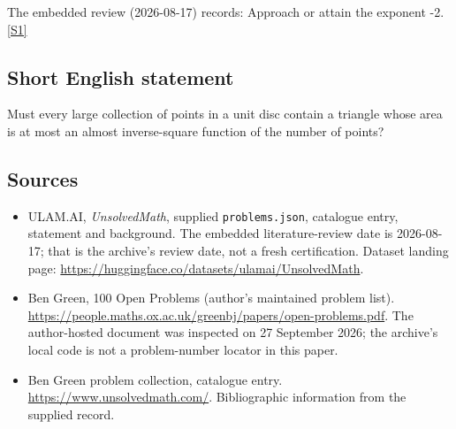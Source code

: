 \documentclass[11pt,a4paper]{article}
\newcommand{\sref}[2]{\hyperlink{source:#1:#2}{[S#2]}}
\begin{document}
The embedded review (2026-08-17) records: Approach or attain the exponent -2. \sref{statement}{1}

\subsection{Short English statement}

Must every large collection of points in a unit disc contain a triangle whose area is at most an almost inverse-square function of the number of points?

\subsection{Sources}

{\small

\begin{itemize}

\item[\hypertarget{source:statement:1}{S1}] ULAM.AI, \emph{UnsolvedMath}, supplied \texttt{problems.json}, catalogue entry, statement and background. The embedded literature-review date is 2026-08-17; that is the archive’s review date, not a fresh certification. Dataset landing page: \url{https://huggingface.co/datasets/ulamai/UnsolvedMath}.

\item[\hypertarget{source:statement:2}{S2}] Ben Green, 100 Open Problems (author’s maintained problem list). \url{https://people.maths.ox.ac.uk/greenbj/papers/open-problems.pdf}. The author-hosted document was inspected on 27 September 2026; the archive’s local code is not a problem-number locator in this paper.

\item[\hypertarget{source:statement:3}{S3}] Ben Green problem collection, catalogue entry. \url{https://www.unsolvedmath.com/}. Bibliographic information from the supplied record.

\end{itemize}

}

\label{end:statement}
\end{document}
